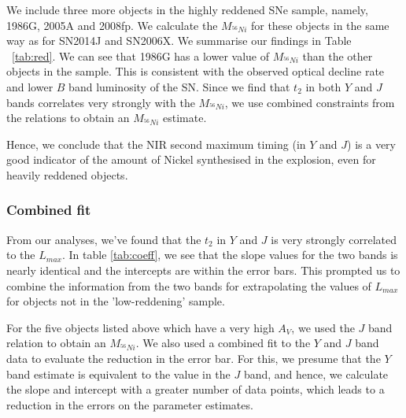 


We include three more objects in the highly reddened SNe sample, namely, 1986G, 2005A and 2008fp. We calculate the $M_{^{56}Ni}$ for these objects in the same way as for SN2014J and SN2006X. We summarise our findings in Table ~\ref{tab:red}.
We can see that 1986G has a lower value of $M_{^{56}Ni}$ than the other objects in the sample. This is consistent with the observed optical decline rate and lower $B$ band luminosity of the SN. Since we find that $t_2$ in both $Y$ and $J$ bands correlates very strongly with the $M_{^{56}Ni}$, we use combined constraints from the relations to obtain an $M_{^{56}Ni}$ estimate.



Hence, we conclude that the NIR second maximum timing (in $Y$ and $J$) is a very good indicator of the amount of Nickel synthesised in the explosion, even for heavily reddened objects. 


\subsubsection{Combined fit}
From our analyses, we've found that the $t_2$ in $Y$ and $J$ is very strongly correlated to the $L_{max}$. In table \ref{tab:coeff}, we see that the slope values for the two bands is nearly identical and the intercepts are within the error bars. This prompted us to combine the information from the two bands for extrapolating the values of $L_{max}$ for objects not in the 'low-reddening' sample.

For the five objects listed above which have a very high $A_V$, we used the $J$ band relation to obtain an $M_{^{56}Ni}$. We also used a combined fit to the $Y$ and $J$ band data to evaluate the reduction in the error bar. For this, we presume that the $Y$ band estimate is equivalent to the value in the $J$ band, and hence, we calculate the slope and intercept with a greater number of data points, which leads to a reduction in the errors on the parameter estimates.  

